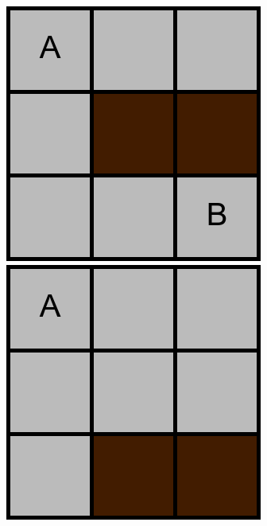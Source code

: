 \begin{figure}[!htb]
\endminipage\hfill
{}
\includegraphics[width=\linewidth]{2.png}
\endminipage\hfill
{}
\includegraphics[width=\linewidth]{3.png}

\end{figure}
